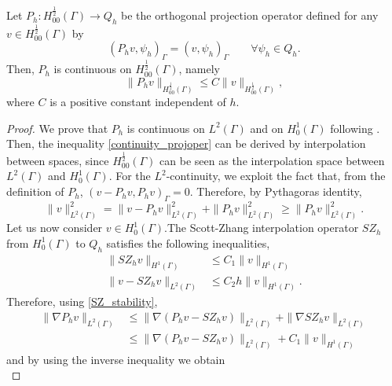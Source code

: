 \begin{lemma}\label{lemma:prob1_orthproj}
Let $P_h: H^{\frac 12}_{00}(\Gamma) \rightarrow Q_h$ be the orthogonal projection operator defined  for any $v \in H^{\frac 12}_{00}(\Gamma)$ by
\begin{equation*}
(P_h v , \psi_h)_\Gamma= (v, \psi_h)_\Gamma \qquad \forall \psi_h \in Q_h.  
\end{equation*} 
Then, $P_h$ is continuous on $H^{\frac 12}_{00}(\Gamma)$, namely
\begin{equation}\label{continuity_projoper}
\|P_h v\|_{H^{\frac 12}_{00}(\Gamma)} \leq C \|v\|_{H^{\frac 12}_{00}(\Gamma)},
\end{equation}
where $C$ is a positive constant independent of $h$.
\end{lemma}
\begin{proof}
We prove that $P_h$ is continuous on $L^2(\Gamma)$ and on $H^1_0(\Gamma)$ following \cite[Section 1.6.3]{MR2050138}.  Then, the inequality \eqref{continuity_projoper} can be derived by interpolation between spaces, since $H^\frac12_{00}(\Gamma)$ can be seen as the interpolation space between $L^2(\Gamma)$ and $H^1_0(\Gamma)$. For the $L^2$-continuity, we exploit the fact that, from the definition of $P_h$, $(v-P_h v,P_h v)_{\Gamma}=0$.
Therefore, by Pythagoras identity,
\begin{equation*}
\|v\|^2_{L^2(\Gamma)} = \|v-P_h v\|_{L^2(\Gamma)}^2 + \|P_h v\|_{L^2(\Gamma)}^2 \geq \|P_h v\|^2 _{L^2(\Gamma)}.
\end{equation*}
Let us now consider $v\in H^1_0(\Gamma)$.The Scott-Zhang interpolation operator $SZ_h$ from $H^1_0(\Gamma)$ to $Q_h$ satisfies the following inequalities,
\begin{align}
\label{SZ_stability}
\|SZ_h v\|_{H^1(\Gamma)} &\leq C_1 \|v\|_{H^1(\Gamma)}
\\
\label{SZ_approx}
\|v -SZ_h v \|_{L^2(\Gamma)} &\leq C_2 h \|v\|_{H^1(\Gamma)}.
\end{align}
Therefore, using \eqref{SZ_stability},
\begin{equation*}
\begin{split}
\|\nabla P_h v\|_{L^2(\Gamma)} 
&\leq \|\nabla (P_h v - SZ_h v)\|_{L^2(\Gamma)} + \|\nabla SZ_h v\|_{L^2(\Gamma)}\\
&\leq  \|\nabla (P_h v - SZ_h v)\|_{L^2(\Gamma)} + C_1\|v\|_{H^1(\Gamma)}
\end{split}
\end{equation*}
and by using the inverse inequality we obtain
\begin{equation*}

\end{equation*}
\end{proof}
